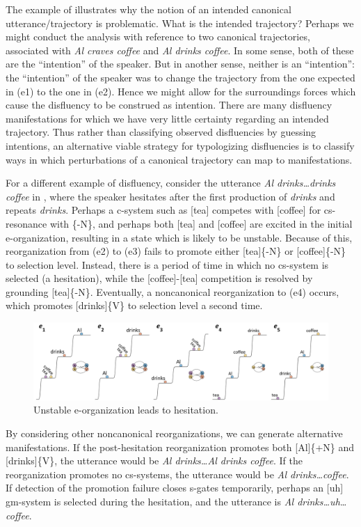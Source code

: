   The example of {} illustrates why the notion of an intended canonical utterance/trajectory is problematic. What is the intended trajectory? Perhaps we might conduct the analysis with reference to two canonical trajectories, associated with \textit{Al craves coffee} and \textit{Al drinks coffee}. In some sense, both of these are the “intention” of the speaker. But in another sense, neither is an “intention”: the “intention” of the speaker was to change the trajectory from the one expected in (e1) to the one in (e2). Hence we might allow for the surroundings forces which cause the disfluency to be construed as intention. There are many disfluency manifestations for which we have very little certainty regarding an intended trajectory. Thus rather than classifying observed disfluencies by guessing intentions, an alternative viable strategy for typologizing disfluencies is to classify ways in which perturbations of a canonical trajectory can map to manifestations.

  For a different example of disfluency, consider the utterance \textit{Al drinks…drinks coffee} in {}, where the speaker hesitates after the first production of \textit{drinks} and repeats \textit{drinks}. Perhaps a c-system such as [tea] competes with [coffee] for cs-resonance with \{-N\}, and perhaps both [tea] and [coffee] are excited in the initial e-organization, resulting in a state which is likely to be unstable. Because of this, reorganization from (e2) to (e3) fails to promote either [tea]\{-N\} or [coffee]\{-N\} to selection level. Instead, there is a period of time in which no cs-system is selected (a hesitation), while the [coffee]-[tea] competition is resolved by grounding [tea]\{-N\}. Eventually, a noncanonical reorganization to (e4) occurs, which promotes [drinks]\{V\} to selection level a second time. 

  
\begin{figure}
\includegraphics[width=\textwidth]{figures/Tilsen-img61.png}
\caption{Unstable e-organization leads to hesitation.}
\label{fig:4:11}
\end{figure}
 

  By considering other noncanonical reorganizations, we can generate alternative manifestations. If the post-hesitation reorganization promotes both [Al]\{+N\} and [drinks]\{V\}, the utterance would be \textit{Al drinks…Al drinks coffee}. If the reorganization promotes no cs-systems, the utterance would be \textit{Al drinks…coffee}. If detection of the promotion failure closes s-gates temporarily, perhaps an [uh] gm-system is selected during the hesitation, and the utterance is \textit{Al drinks…uh…coffee}.

